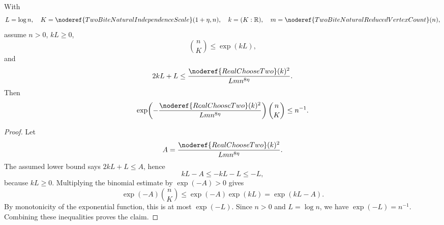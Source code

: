 \begin{helper}
With
\[
L=\log n,\quad
K=\noderef{TwoBiteNaturalIndependenceScale}(1+\eta,n),\quad
k=(K:\mathbb R),\quad
m=\noderef{TwoBiteNaturalReducedVertexCount}(n),
\]
assume \(n>0\), \(kL\ge0\),
\[
\binom nK\le \exp(kL),
\]
and
\[
2kL+L\le
\frac{\noderef{RealChooseTwo}(k)^2}{Lm n^{8\eta}}.
\]
Then
\[
\exp\!\left(
-\frac{\noderef{RealChooseTwo}(k)^2}{Lm n^{8\eta}}
\right)\binom nK\le n^{-1}.
\]
\end{helper}
\begin{proof}
Let
\[
A=\frac{\noderef{RealChooseTwo}(k)^2}{Lm n^{8\eta}}.
\]
The assumed lower bound says \(2kL+L\le A\), hence
\[
kL-A\le -kL-L\le -L,
\]
because \(kL\ge0\).  Multiplying the binomial estimate by
\(\exp(-A)>0\) gives
\[
\exp(-A)\binom nK\le\exp(-A)\exp(kL)=\exp(kL-A).
\]
By monotonicity of the exponential function, this is at most
\(\exp(-L)\).  Since \(n>0\) and \(L=\log n\), we have
\(\exp(-L)=n^{-1}\).  Combining these inequalities proves the claim.
\end{proof}

